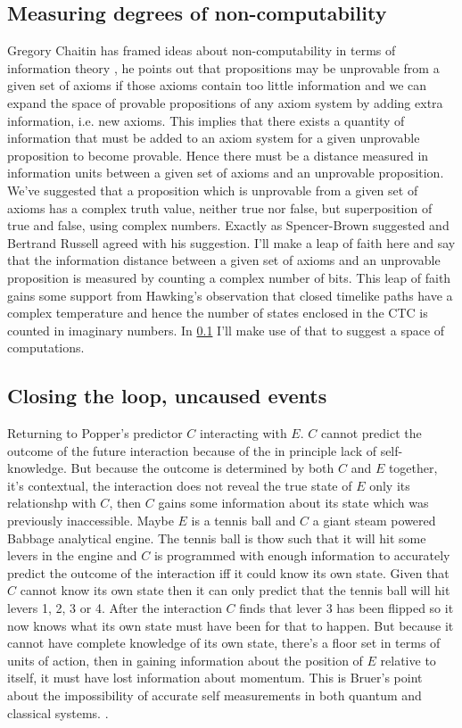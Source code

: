 \subsection{Measuring degrees of non-computability}
\label{sec:measuring-non-computability}
Gregory Chaitin has framed ideas about non-computability in terms of information theory \autocite{Chaitin1987AlgorithmicTheory}, he points out that propositions may be unprovable from a given set of axioms if those axioms contain too little information and we can expand the space of provable propositions of any axiom system by adding extra information, i.e. new axioms. This implies that there exists a quantity of information that must be added to an axiom system for a given unprovable proposition to become provable. Hence there must be a distance measured in information units between a given set of axioms and an unprovable proposition. We've suggested that a proposition which is unprovable from a given set of axioms has a complex truth value, neither true nor false, but superposition of true and false, using complex numbers. Exactly as Spencer-Brown suggested and Bertrand Russell agreed with his suggestion. I'll make a leap of faith here and say that the information distance between a given set of axioms and an unprovable proposition is measured by counting a complex number of bits. This leap of faith gains some support from Hawking's observation that closed timelike paths have a complex temperature \autocite{Hawking1995QuantumCurves} and hence the number of states enclosed in the CTC is counted in imaginary numbers. In \ref{sec:measuring-non-computability} I'll make use of that to suggest a space of computations. 

\subsection{Closing the loop, uncaused events}
Returning to Popper's predictor $C$ interacting with $E$. $C$ cannot predict the outcome of the future interaction because of the in principle lack of self-knowledge. But because the outcome is determined by both $C$ and $E$ together, it's contextual, the interaction does not reveal the true state of $E$ only its relationshp with $C$, then $C$ gains some information about its state which was previously inaccessible. Maybe $E$ is a tennis ball and $C$ a giant steam powered Babbage analytical engine. The tennis ball is thow such that it will hit some levers in the engine and $C$ is programmed with enough information to accurately predict the outcome of the interaction iff it could know its own state. Given that $C$ cannot know its own state then it can only predict that the tennis ball will hit levers 1, 2, 3 or 4. After the interaction $C$ finds that lever 3 has been flipped so it now knows what its own state must have been for that to happen. But because it cannot have complete knowledge of its own state, there's a floor set in terms of units of action, then in gaining information about the position of $E$ relative to itself, it must have lost information about momentum. This is Bruer's point about the impossibility of accurate self measurements in both quantum and classical systems.  \autocite{Breuer1995}. 

